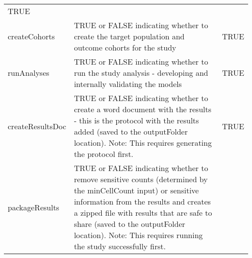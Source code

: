 \documentclass[
]{article}
\begin{document}
\begin{longtable}[]{@{}lll@{}}
\begin{minipage}[t]{0.24\columnwidth}
TRUE\strut
\end{minipage}\tabularnewline
\begin{minipage}[t]{0.21\columnwidth}\raggedright
createCohorts\strut
\end{minipage} & \begin{minipage}[t]{0.46\columnwidth}\raggedright
TRUE or FALSE indicating whether to create the target population and
outcome cohorts for the study\strut
\end{minipage} & \begin{minipage}[t]{0.24\columnwidth}\raggedright
TRUE\strut
\end{minipage}\tabularnewline
\begin{minipage}[t]{0.21\columnwidth}\raggedright
runAnalyses\strut
\end{minipage} & \begin{minipage}[t]{0.46\columnwidth}\raggedright
TRUE or FALSE indicating whether to run the study analysis - developing
and internally validating the models\strut
\end{minipage} & \begin{minipage}[t]{0.24\columnwidth}\raggedright
TRUE\strut
\end{minipage}\tabularnewline
\begin{minipage}[t]{0.21\columnwidth}\raggedright
createResultsDoc\strut
\end{minipage} & \begin{minipage}[t]{0.46\columnwidth}\raggedright
TRUE or FALSE indicating whether to create a word document with the
results - this is the protocol with the results added (saved to the
outputFolder location). Note: This requires generating the protocol
first.\strut
\end{minipage} & \begin{minipage}[t]{0.24\columnwidth}\raggedright
TRUE\strut
\end{minipage}\tabularnewline
\begin{minipage}[t]{0.21\columnwidth}\raggedright
packageResults\strut
\end{minipage} & \begin{minipage}[t]{0.46\columnwidth}\raggedright
TRUE or FALSE indicating whether to remove sensitive counts (determined
by the minCellCount input) or sensitive information from the results and
creates a zipped file with results that are safe to share (saved to the
outputFolder location). Note: This requires running the study
successfully first.\strut
\end{minipage} & \begin{minipage}[t]{0.24\columnwidth}\raggedright

\end{minipage}
\end{longtable}
\end{document}
